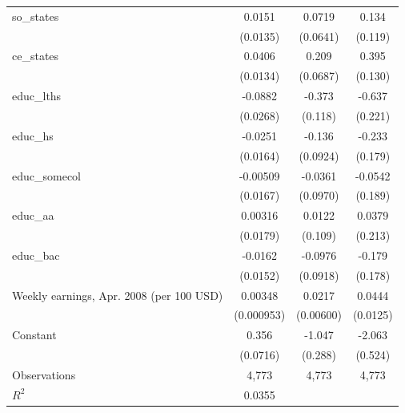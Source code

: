 \begin{table}[htbp]
\begin{tabular}{l*{3}{c}}
so\_states           &      0.0151         &      0.0719         &       0.134         \\
                    &    (0.0135)         &    (0.0641)         &     (0.119)         \\
\addlinespace
ce\_states           &      0.0406\sym{***}&       0.209\sym{***}&       0.395\sym{***}\\
                    &    (0.0134)         &    (0.0687)         &     (0.130)         \\
\addlinespace
educ\_lths           &     -0.0882\sym{***}&      -0.373\sym{***}&      -0.637\sym{***}\\
                    &    (0.0268)         &     (0.118)         &     (0.221)         \\
\addlinespace
educ\_hs             &     -0.0251         &      -0.136         &      -0.233         \\
                    &    (0.0164)         &    (0.0924)         &     (0.179)         \\
\addlinespace
educ\_somecol        &    -0.00509         &     -0.0361         &     -0.0542         \\
                    &    (0.0167)         &    (0.0970)         &     (0.189)         \\
\addlinespace
educ\_aa             &     0.00316         &      0.0122         &      0.0379         \\
                    &    (0.0179)         &     (0.109)         &     (0.213)         \\
\addlinespace
educ\_bac            &     -0.0162         &     -0.0976         &      -0.179         \\
                    &    (0.0152)         &    (0.0918)         &     (0.178)         \\
\addlinespace
Weekly earnings, Apr. 2008 (per 100 USD)&     0.00348\sym{***}&      0.0217\sym{***}&      0.0444\sym{***}\\
                    &  (0.000953)         &   (0.00600)         &    (0.0125)         \\
\addlinespace
Constant            &       0.356\sym{***}&      -1.047\sym{***}&      -2.063\sym{***}\\
                    &    (0.0716)         &     (0.288)         &     (0.524)         \\
\midrule
Observations        &       4,773         &       4,773         &       4,773         \\
$R^2$               &      0.0355         &                     &                     \\

\end{tabular}
\end{table}
